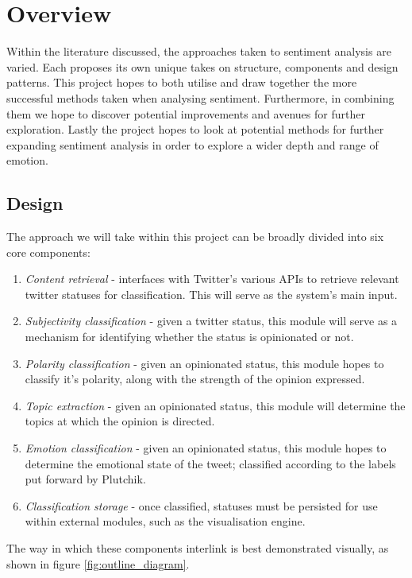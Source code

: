 \chapter{Overview}
\label{Overview}

Within the literature discussed, the approaches taken to sentiment analysis are varied. Each proposes its own unique takes on structure, components and design patterns. This project hopes to both utilise and draw together the more successful methods taken when analysing sentiment. Furthermore, in combining them we hope to discover potential improvements and avenues for further exploration. Lastly the project hopes to look at potential methods for further expanding sentiment analysis in order to explore a wider depth and range of emotion.

\section{Design}

The approach we will take within this project can be broadly divided into six core components:

\begin{enumerate}
	\item \emph{Content retrieval} - interfaces with Twitter's various APIs to retrieve relevant twitter statuses for classification. This will serve as the system's main input.
	\item \emph{Subjectivity classification} - given a twitter status, this module will serve as a mechanism for identifying whether the status is opinionated or not.
	\item \emph{Polarity classification} - given an opinionated status, this module hopes to classify it's polarity, along with the strength of the opinion expressed.
	\item \emph{Topic extraction} - given an opinionated status, this module will determine the topics at which the opinion is directed.
	\item \emph{Emotion classification} - given an opinionated status, this module hopes to determine the emotional state of the tweet; classified according to the labels put forward by Plutchik.
	\item \emph{Classification storage} - once classified, statuses must be persisted for use within external modules, such as the visualisation engine.
\end{enumerate}

The way in which these components interlink is best demonstrated visually, as shown in figure \ref{fig:outline_diagram}.

